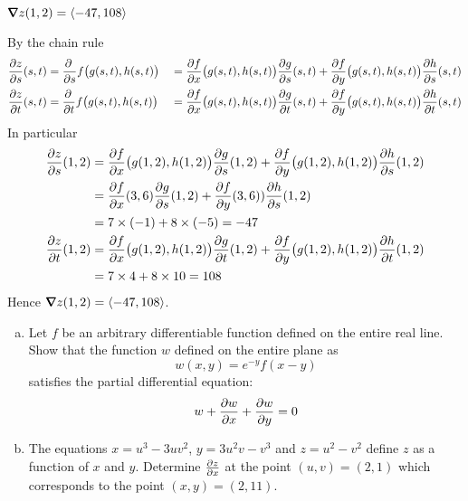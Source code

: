 %

\begin{answer}
$\vnabla z(1,2)=\llt -47,108\rgt$
\end{answer}

\begin{solution}
By the chain rule
\begin{alignat*}{5}
\pdiff{z}{s}(s,t)
&=\pdiff{}{s}f\big(g(s,t),h(s,t)\big)
&&=\pdiff{f}{x}\big(g(s,t),h(s,t)\big)
            \pdiff{g}{s}(s,t)
+\pdiff{f}{y}\big(g(s,t),h(s,t)\big)
            \pdiff{h}{s}(s,t) \\
\pdiff{z}{t}(s,t)
&=\pdiff{}{t}f\big(g(s,t),h(s,t)\big)
&&=\pdiff{f}{x}\big(g(s,t),h(s,t)\big)
            \pdiff{g}{t}(s,t)
+\pdiff{f}{y}\big(g(s,t),h(s,t)\big)
            \pdiff{h}{t}(s,t)
\end{alignat*}
In particular
\begin{align*}
\pdiff{z}{s}(1,2)
&=\pdiff{f}{x}\big(g(1,2),h(1,2)\big)
            \pdiff{g}{s}(1,2)
+\pdiff{f}{y}\big(g(1,2),h(1,2)\big)
            \pdiff{h}{s}(1,2) \\
&=\pdiff{f}{x}(3,6)
            \pdiff{g}{s}(1,2)
+\pdiff{f}{y}(3,6))
            \pdiff{h}{s}(1,2) \\
&=7\times(-1)+8\times(-5)
=-47\\
\pdiff{z}{t}(1,2)
&=\pdiff{f}{x}\big(g(1,2),h(1,2)\big)
            \pdiff{g}{t}(1,2)
+\pdiff{f}{y}\big(g(1,2),h(1,2)\big)
            \pdiff{h}{t}(1,2) \\
&=7\times4+8\times 10
=108
\end{align*}
Hence $\vnabla z(1,2)=\llt -47,108\rgt$.
\end{solution}

\begin{question} [M200 2002D] %
\begin{enumerate}[(a)]
\item
Let $f$ be an arbitrary differentiable function defined on the entire 
real line. Show that the function $w$ defined on the entire plane as
\begin{equation*}
w(x,y)=e^{-y}f(x-y)
\end{equation*}
satisfies the partial differential equation:
\begin{equation*}
w+\pdiff{w}{x}+\pdiff{w}{y}=0
\end{equation*}
\item
The equations $x=u^3-3uv^2$, $y=3u^2v-v^3$ and $z=u^2-v^2$
define $z$ as a function of $x$ and $y$. Determine 
$\pdiff{z}{x}$ at the point $(u,v)=(2,1)$ which 
corresponds to the point $(x,y)=(2,11)$.
\end{enumerate}
\end{question}

